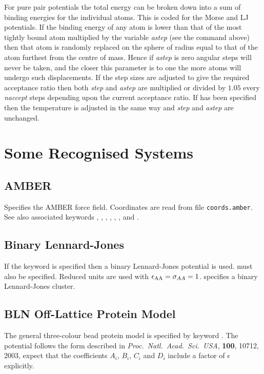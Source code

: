 For pure pair potentials the total energy can be broken down into a sum of binding
energies for the individual atoms. This is coded for the Morse and LJ potentials.
If the binding energy of any atom is lower than that of the most tightly bound atom
multiplied by the variable {\it astep\/} (see the {\/} command above) then
that atom is randomly replaced on the sphere of radius equal to that of the atom furthest
from the centre of mass. Hence if {\it astep\/} is zero angular steps will never be taken,
and the closer this parameter is to one the more atoms will undergo such displacements.
If the step sizes are adjusted to give the required acceptance ratio then both {\it step\/} and
{\it astep\/} are multiplied or divided by $1.05$ every {\it naccept\/} steps depending
upon the current acceptance ratio. If {\/} has been specified then the temperature
is adjusted in the same way and {\it step\/} and {\it astep\/} are unchanged.

\section{Some Recognised Systems}

\subsection{AMBER}

Specifies the AMBER force field. Coordinates are read from file {\tt coords.amber}.
See also associated keywords {\/}, {\/}, {\/}, {\/},
{\/}, {\/}, {\/} and {\/}.

\subsection{Binary Lennard-Jones}

If the {\/} keyword is specified then a binary Lennard-Jones
potential is used\cite{sastryds98}. {\/} must also be
specified. Reduced units are used with $\epsilon_{\rm AA}=\sigma_{AA}=1$.
{\/} specifies a binary Lennard-Jones cluster.

\subsection{BLN Off-Lattice Protein Model}
\label{sec:BLN}

The general three-colour bead protein model is specified by keyword {}.
The potential follows the form described in
{\it Proc.~Natl.~Acad.~Sci.~USA}, {\bf 100}, 10712, 2003, expect that
the coefficients $A_i$, $B_i$, $C_i$ and $D_i$ include a factor of $\epsilon$
explicitly.

